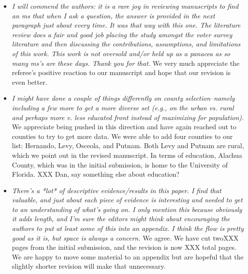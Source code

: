 \documentclass[12pt]{article}
\begin{document}
\begin{itemize}

\item \emph{I will commend the authors: it is a rare joy in reviewing
    manuscripts to find an ms that when I ask a question, the answer
    is provided in the next paragraph just about every time. It was
    that way with this one. The literature review does a fair and good
    job placing the study amongst the voter survey literature and then
    discussing the contributions, assumptions, and limitations of this
    work. This work is not oversold and/or held up as a panacea as so
    many ms's are these days. Thank you for that.}  We very much
  appreciate the referee's positive reaction to our manuscript and
  hope that our revision is even better.

\item \emph{I might have done a couple of things differently on county
    selection--namely including a few more to get a more diverse set
    (e.g., on the urban vs. rural and perhaps more v. less educated
    front instead of maximizing for population).}  We appreciate being
  pushed in this direction and have again reached out to counties to
  try to get more data.  We were able to add four counties to our
  list: Hernando, Levy, Osceola, and Putnam.  Both Levy and Putnam are
  rural, which we point out in the revised manuscript.  In terms of
  education, Alachua County, which was in the initial submission, is
  home to the University of Florida.  XXX Dan, say something else
  about education?


\item \emph{There's a *lot* of descriptive evidence/results in this
    paper. I find that valuable, and just about each piece of evidence
    is interesting and needed to get to an understanding of what's
    going on. I only mention this because obviously it adds length,
    and I'm sure the editors might think about encouraging the authors
    to put at least some of this into an appendix. I think the flow is
    pretty good as it is, but space is always a concern.}  We agree.
  We have cut twoXXX pages from the initial submission, and the
  revision is now XXX total pages.  We are happy to move some material
  to an appendix but are hopeful that the slightly shorter revision
  will make that unnecessary.
\end{itemize}
\end{document}
